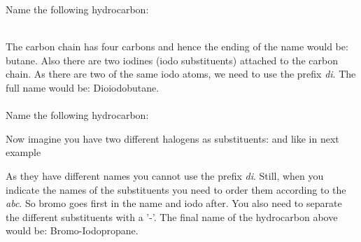 \documentclass[main.tex]{subfiles}
\begin{document}
\begin{description}
\begin{example} %
Name the following hydrocarbon:
\begin{center} \end{center}
\\
The carbon chain has four carbons and hence the ending of the name would be: butane. Also there are two iodines (iodo substituents) attached to the carbon chain. As there are two of the same iodo atoms, we need to use the prefix \emph{di}. The full name would be: Dioiodobutane.
\\
\faDiamond\ \\
Name the following hydrocarbon:
\begin{center} \end{center}
\end{example}%



\item[\docfilehook{\smallpencil Alkanes with different substituents}{Alkanes with different substituents}] 
Now imagine you have two different halogens as substituents:  and  like in next example

\begin{center} \end{center}
As they have different names you cannot use the prefix \emph{di}. Still, when you indicate the names of the substituents you need to order them according to the \emph{abc}. So bromo goes first in the name and iodo after. You also need to separate the different substituents with a '-'. The final name of the hydrocarbon above would be: Bromo-Iodopropane.




\end{description}
\end{document}
